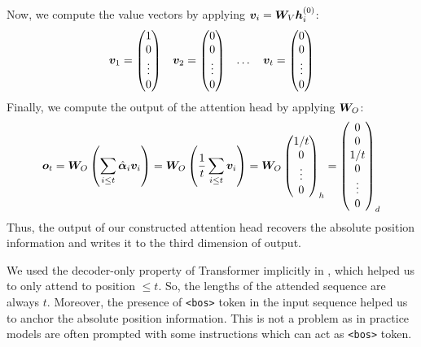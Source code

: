\documentclass{article}
\begin{document}
Now, we compute the value vectors by applying ${\bm{v}}_i = {\bm{W}}_V{\bm{h}}_i^{(0)}$:
\begin{align}
  \label{eq:abs_value}
  \begin{array}{cccc}
    {\bm{v}}_1 = \begin{pmatrix} 1 \\ 0 \\ \vdots \\ 0 \end{pmatrix} &
    {\bm{v}}_2 = \begin{pmatrix} 0 \\ 0 \\ \vdots \\ 0 \end{pmatrix} &
    \dots                                                       &
    {\bm{v}}_{t} = \begin{pmatrix} 0 \\ 0 \\ \vdots \\ 0 \end{pmatrix}
  \end{array}
\end{align}
Finally, we compute the output of the attention head by applying ${\bm{W}}_O$:
\begin{align}
  \label{eq:abs_output2}
  {\bm{o}}_t = {\bm{W}}_O \left(\sum_{i\le t} \hat{{\bm{\alpha}}}_i{\bm{v}}_i \right) = {\bm{W}}_O \left(\frac{1}{t}\sum_{i\le t} {\bm{v}}_i \right) = {\bm{W}}_O \begin{pmatrix} 1/t \\ 0 \\ \vdots \\ 0 \end{pmatrix}_{h} = \begin{pmatrix} 0 \\ 0 \\ 1/t \\ 0 \\ \vdots \\ 0 \end{pmatrix}_{d}
\end{align}
Thus, the output of our constructed attention head recovers the absolute position information and writes it to the third dimension of output.

We used the decoder-only property of Transformer implicitly in , which helped us to only attend to position $\le t$. So, the lengths of the attended sequence are always $t$. Moreover, the presence of \texttt{<bos>} token in the input sequence helped us to anchor the absolute position information. This is not a problem as in practice models are often prompted with some instructions which can act as \texttt{<bos>} token.
\end{document}
